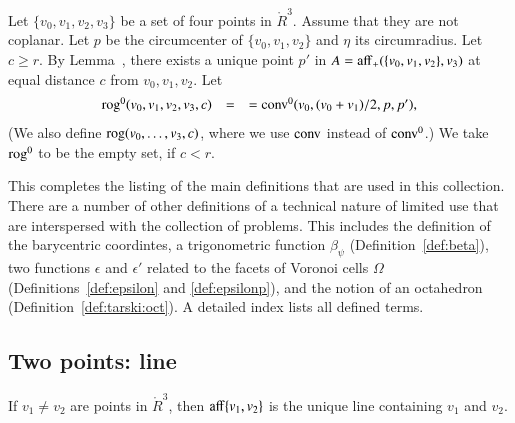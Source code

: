 \begin{tarskidata}
\begin{tarski}
\begin{definition} 
Let $\{v_0,v_1,v_2,v_3\}$ be a set of four points in $\ring{R}^3$.
Assume that they are not coplanar.  Let $p$ be the circumcenter
of $\{v_0,v_1,v_2\}$ and $\eta$ its circumradius.  Let $c\ge r$.
By Lemma~, there exists a unique
point $p'$ in $A={\operatorname{aff}}_+(\{v_0,v_1,v_2\},v_3)$ at equal distance $c$
from $v_0,v_1,v_2$.
Let $$
    \begin{array}{rll}
    {\operatorname{rog}}^0(v_0,v_1,v_2,v_3,c) &= 
    &= {\operatorname{conv}}^0(v_0,(v_0+v_1)/2,p,p'),\\
    \end{array}
    $$
(We also define ${\operatorname{rog}}(v_0,\ldots,v_3,c)$, where we use
${\operatorname{conv}}$ instead of ${\operatorname{conv}}^0$.)
We take ${\operatorname{rog}}^0$ to be the empty set, if $c< r$.
\end{definition}
This completes the listing of the main definitions that
are used in this collection.  There are a number of other
definitions of a technical nature of limited use that
are interspersed with the collection of problems.
This includes the definition of the barycentric coordintes,
a trigonometric function $\beta_\psi$ (Definition~\ref{def:beta}),
two functions $\epsilon$ and $\epsilon'$ related to the
facets of Voronoi cells $\Omega$ (Definitions~\ref{def:epsilon}
and \ref{def:epsilonp}), and the notion of an octahedron
(Definition~\ref{def:tarski:oct}).  A detailed index lists
all defined terms.
\end{tarski}










\begin{tarski}
\section{Two points: line}

\begin{lemma}
	If $v_1\ne v_2$ are points in $\ring{R}^3$, then ${\operatorname{aff}}\{v_1,v_2\}$ is the unique
line containing $v_1$ and $v_2$.
\end{lemma}


\end{tarski}
\end{tarskidata}
